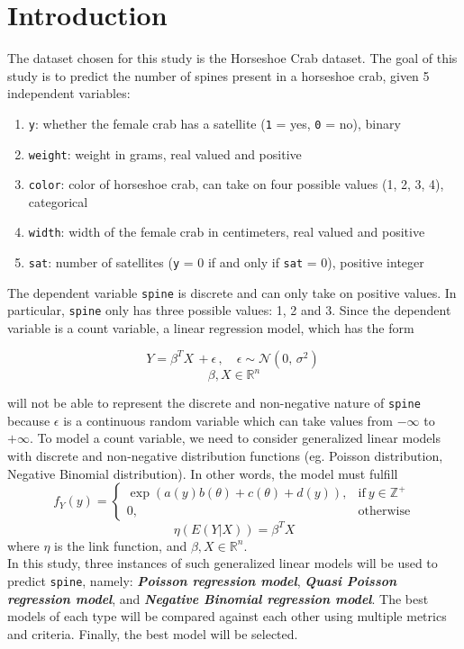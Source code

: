 \documentclass[a4paper, 12pt]{article}
\begin{document}
\tableofcontents
\thispagestyle{empty} %
\newpage 


\section{Introduction}
\noindent The dataset chosen for this study is the Horseshoe Crab dataset. The goal of this study is to predict the number of spines present in a horseshoe crab, given 5 independent variables: 

\begin{enumerate}
  \item \texttt{y}: whether the female crab has a satellite (\texttt{1} = yes, \texttt{0} = no), binary
  \item \texttt{weight}: weight in grams, real valued and positive
  \item \texttt{color}: color of horseshoe crab, can take on four possible values (1, 2, 3, 4), categorical
  \item \texttt{width}: width of the female crab in centimeters, real valued and positive
  \item \texttt{sat}: number of satellites (\texttt{y} = 0 if and only if \texttt{sat} = 0), positive integer
\end{enumerate}

\noindent The dependent variable \texttt{spine} is discrete and can only take on positive values. In particular, \texttt{spine} only has three possible values: 1, 2 and 3. Since the dependent variable is a count variable, a linear regression model, which has the form 


$$ Y = \beta^TX \,+ \epsilon \, , \quad \epsilon \sim \mathcal{N}(0,\,\sigma^{2})\ $$
$$ \beta, X \in \mathbb{R}^n $$

\noindent will not be able to represent the discrete and non-negative nature of \texttt{spine} because $\epsilon$ is a continuous random variable which can take values from $-\infty$ to $+\infty$. To model a count variable, we need to consider generalized linear models with discrete and non-negative distribution functions (eg. Poisson distribution, Negative Binomial distribution). In other words, the model must fulfill
\begin{equation}
    f_Y(y) =
    \begin{cases}
      \exp(a(y)b(\theta) + c(\theta) + d(y)), & \text{if}\ y \in \mathbb{Z^+} \\
      0, & \text{otherwise}
    \end{cases}
    \label{discrete-exponential-family}
\end{equation}
$$ \eta(E(Y|X)) = \beta^TX $$
where $\eta$ is the link function, and $ \beta, X \in \mathbb{R}^n $. \\
\indent In this study, three instances of such generalized linear models will be used to predict \texttt{spine}, namely: \textbf{\textit{Poisson regression model}}, \textbf{\textit{Quasi Poisson regression model}}, and \textbf{\textit{Negative Binomial regression model}}. The best models of each type will be compared against each other using multiple metrics and criteria. Finally, the best model will be selected.     
\end{document}

